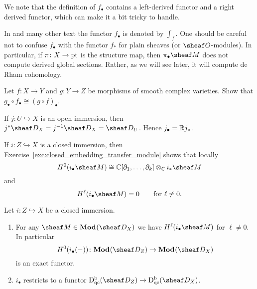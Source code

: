 \documentclass[number-in-sections,a4paper]{notes}
\begin{document}
We note that the definition of $f_\bullet$ contains a left-derived functor and a right derived functor, which can make it a bit tricky to handle.

\begin{Remark}
    In \cite{HottaTakeuchiTanisaki:2008:DModulesPerverseSheavesRepresentationTheory} and many other text the functor $f_\bullet$ is denoted by $\int_f$.
    One should be careful not to confuse $f_\bullet$ with the functor $f_*$ for plain sheaves (or $\sO$-modules).
    In particular, if $\pi\colon X \to \mathrm{pt}$ is the structure map, then $\pi_\bullet\sheaf M$ does not compute derived global sections.
    Rather, as we will see later, it will compute de Rham cohomology.
\end{Remark}

\begin{Exercise}
    Let $f\colon X \to Y$ and $g\colon Y \to Z$ be morphisms of smooth complex varieties.
    Show that $g_\bullet \circ f_\bullet \cong (g \circ f)_\bullet$.
\end{Exercise}


\begin{Example}
    If $j\colon U \hookrightarrow X$ is an open immersion, then $j^*\sD_X = j^{-1}\sD_X = \sD_U$.
    Hence $j_\bullet = {\mathbb{R}} j_*$.
\end{Example}

\begin{Example}
    If $i\colon Z \hookrightarrow X$ is a closed immersion, then Exercise~\ref{exc:closed_embedding_transfer_module} shows that locally
    \[
        H^0(i_\bullet \sheaf M) \cong \CC[\partial_1,\dotsc,\partial_k] \otimes_\CC i_*\sheaf M
    \]
    and
    \[
        H^\ell(i_\bullet \sheaf M) = 0 \qquad \text{for } \ell \ne 0.
    \]
\end{Example}

\begin{Corollary}
    Let $i\colon Z \hookrightarrow X$ be a closed immersion.
    \begin{enumerate}
        \item For any $\sheaf M \in \catDMod{X}$ we have $H^\ell(i_\bullet \sheaf M)$ for $\ell \ne 0$.
            In particular 
            \[
                H^0(i_\bullet (-))\colon \catDMod{Z} \to \catDMod{X}
            \]
            is an exact functor.
        \item $i_\bullet$ restricts to a functor $\catDbDModqc{Z} \to \catDbDModqc{X}$.
    \end{enumerate}
\end{Corollary}
\end{document}
